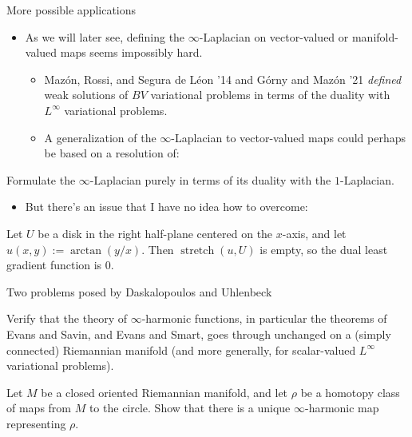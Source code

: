 \documentclass[10pt]{beamer}
\DeclareMathOperator{\Stretch}{stretch}
\begin{document}
\begin{frame}{More possible applications}
    
\begin{itemize}
\item As we will later see, defining the $\infty$-Laplacian on vector-valued or manifold-valued maps seems impossibly hard. \pause
\begin{itemize}
\item Maz\'on, Rossi, and Segura de L\'eon '14 and G\'orny and Maz\'on '21 \emph{defined} weak solutions of $BV$ variational problems in terms of the duality with $L^\infty$ variational problems.
\item A generalization of the $\infty$-Laplacian to vector-valued maps could perhaps be based on a resolution of: \pause
\end{itemize}
\end{itemize}

\begin{problem}
Formulate the $\infty$-Laplacian purely in terms of its duality with the $1$-Laplacian. \pause
\end{problem}

\begin{itemize}
\item But there's an issue that I have no idea how to overcome: \pause
\end{itemize}

\begin{example}
Let $U$ be a disk in the right half-plane centered on the $x$-axis, and let $u(x, y) := \arctan(y/x)$.
Then $\Stretch(u, U)$ is empty, so the dual least gradient function is $0$.
\end{example}
\end{frame}

\begin{frame}{Two problems posed by Daskalopoulos and Uhlenbeck}
\begin{problem}
Verify that the theory of $\infty$-harmonic functions, in particular the theorems of Evans and Savin, and Evans and Smart, goes through unchanged on a (simply connected) Riemannian manifold (and more generally, for scalar-valued $L^\infty$ variational problems). \pause
\end{problem}

\begin{problem}
Let $M$ be a closed oriented Riemannian manifold, and let $\rho$ be a homotopy class of maps from $M$ to the circle.
Show that there is a unique $\infty$-harmonic map representing $\rho$.
\end{problem}
\end{frame}
\end{document}
